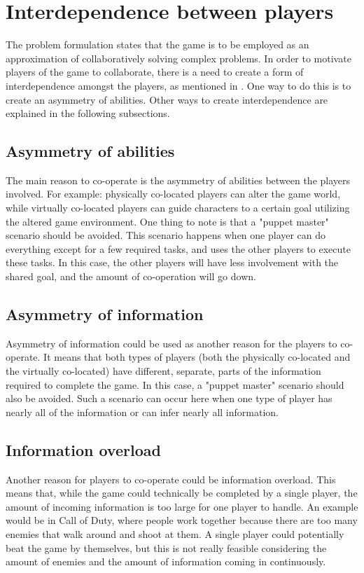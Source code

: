 	\section{Interdependence between players} \label{sec:interdependence}
		The problem formulation states that the game is to be employed as an
		approximation of collaboratively solving complex problems. In order to
		motivate players of the game to collaborate, there is a need to create
		a form of interdependence amongst the players, as mentioned in
		\cite{zagal}. One way to do this is to create an asymmetry of abilities.
		Other ways to create interdependence are explained in the following
		subsections.
		\subsection{Asymmetry of abilities}
			The main reason to co-operate is the asymmetry of abilities between
			the players involved. For example: physically co-located players can
			alter the game world, while virtually co-located players can guide
			characters to a certain goal utilizing the altered game environment.
			One thing to note is that a "puppet master" scenario should be
			avoided. This scenario happens when one player can do everything
			except for a few required tasks, and uses the other players to
			execute these tasks. In this case, the other players will have less
			involvement with the shared goal, and the amount of co-operation
			will go down.
		\subsection{Asymmetry of information}
			Asymmetry of information could be used as another reason for the
			players to co-operate. It means that both types of players (both the
			physically co-located and the virtually co-located) have different,
			separate, parts of the information required to complete the game. In
			this case, a "puppet master" scenario should also be avoided. Such a
			scenario can occur here when one type of player has nearly all of
			the information or can infer nearly all information.

		\subsection{Information overload}
			Another reason for players to co-operate could be information
			overload. This means that, while the game could technically be
			completed by a single player, the amount of incoming information is
			too large for one player to handle. An example would be in Call of
			Duty, where people work together because there are too many enemies
			that walk around and shoot at them. A single player could
			potentially beat the game by themselves, but this is not really
			feasible considering the amount of enemies and the amount of
			information coming in continuously.

	
